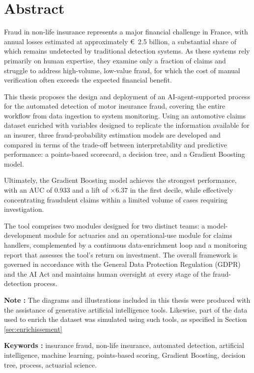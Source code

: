 \chapter*{Abstract}
{}

Fraud in non-life insurance represents a major financial challenge in France, with annual losses estimated at approximately \euro{}~2.5 billion, a substantial share of which remains undetected by traditional detection systems. As these systems rely primarily on human expertise, they examine only a fraction of claims and struggle to address high-volume, low-value fraud, for which the cost of manual verification often exceeds the expected financial benefit.

This thesis proposes the design and deployment of an AI-agent-supported process for the automated detection of motor insurance fraud, covering the entire workflow from data ingestion to system monitoring. Using an automotive claims dataset enriched with variables designed to replicate the information available for an insurer, three fraud-probability estimation models are developed and compared in terms of the trade-off between interpretability and predictive performance: a points-based scorecard, a decision tree, and a Gradient Boosting model.

Ultimately, the Gradient Boosting model achieves the strongest performance, with an AUC of 0.933 and a lift of $\times 6.37$ in the first decile, while effectively concentrating fraudulent claims within a limited volume of cases requiring investigation.

The tool comprises two modules designed for two distinct teams: a model-development module for actuaries and an operational-use module for claims handlers, complemented by a continuous data-enrichment loop and a monitoring report that assesses the tool's return on investment. The overall framework is governed in accordance with the General Data Protection Regulation (GDPR) and the AI Act and maintains human oversight at every stage of the fraud-detection process.

\textbf{Note :} The diagrams and illustrations included in this thesis were produced with the assistance of generative artificial intelligence tools. Likewise, part of the data used to enrich the dataset was simulated using such tools, as specified in Section \ref{sec:enrichissement}

\textbf{Keywords :} insurance fraud, non-life insurance, automated detection, artificial intelligence, machine learning, points-based scoring, Gradient Boosting, decision tree, process, actuarial science.